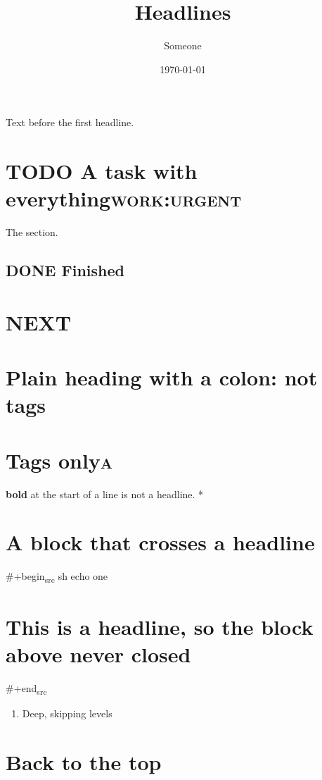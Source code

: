 \documentclass[11pt]{article}
\author{Someone}
\date{\today}
\title{Headlines}
\begin{document}
\maketitle
\tableofcontents

Text before the first headline.

\section[{A task with everything}]{{\bfseries\sffamily TODO} A task with everything\hfill{}\textsc{work:urgent}}
\label{task}

The section.

\subsection[{Finished}]{{\bfseries\sffamily DONE} Finished}
\label{orga5cdd4cd}

\section{{\bfseries\sffamily NEXT}}
\label{org9ecdc9c8}

\section{Plain heading with a colon: not tags}
\label{org9fcdcb5b}

\section[{Tags only}]{Tags only\hfill{}\textsc{a}}
\label{org9ccdc6a2}

\textbf{\textbf{bold}} at the start of a line is not a headline.
*

\section{A block that crosses a headline}
\label{org9dcb899e}

\#+begin\textsubscript{src} sh
echo one

\section{This is a headline, so the block above never closed}
\label{orga2cb917d}

\#+end\textsubscript{src}

\begin{enumerate}

\item Deep, skipping levels
\label{orga0cb8e57}

\end{enumerate}

\section{Back to the top}
\label{org9fcb8cc4}
\end{document}
